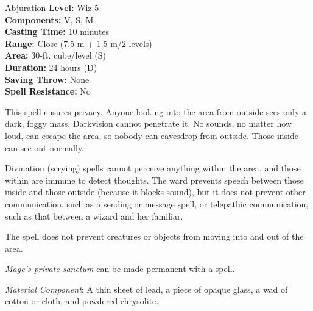 {Abjuration}
{
	\textbf{Level:}
	Wiz 5\\
	\textbf{Components:}
	V, S, M\\
	\textbf{Casting Time:}
	10 minutes\\
	\textbf{Range:}
	Close (7.5 m + 1.5 m/2 levels)\\
	\textbf{Area:}
	30-ft. cube/level (S)\\
	\textbf{Duration:}
	24 hours (D)\\
	\textbf{Saving Throw:}
	None\\
	\textbf{Spell Resistance:}
	No\\
}
{
	This spell ensures privacy. Anyone looking into the area from outside sees only a dark, foggy mass. Darkvision cannot penetrate it. No sounds, no matter how loud, can escape the area, so nobody can eavesdrop from outside. Those inside can see out normally.

	Divination (scrying) spells cannot perceive anything within the area, and those within are immune to detect thoughts. The ward prevents speech between those inside and those outside (because it blocks sound), but it does not prevent other communication, such as a sending or message spell, or telepathic communication, such as that between a wizard and her familiar.

	The spell does not prevent creatures or objects from moving into and out of the area.

	\emph{Mage's private sanctum} can be made permanent with a  spell.

	\textit{Material Component}:
	A thin sheet of lead, a piece of opaque glass, a wad of cotton or cloth, and powdered chrysolite.

}
